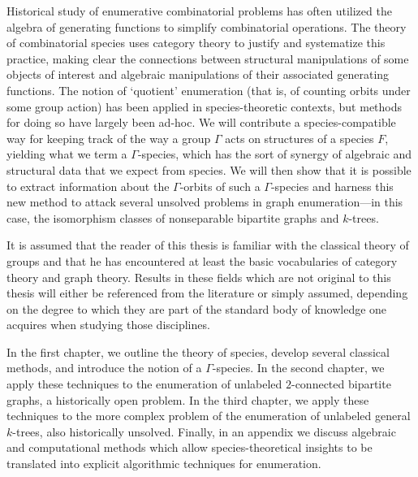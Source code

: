 \documentclass[sectionflow,singlespace,twoside,boldmathhdr,draft]{brandiss} %
\numberwithin{section}{chapter}
\numberwithin{figure}{chapter}
\begin{document}
\begin{disspreface}
  Historical study of enumerative combinatorial problems has often utilized the algebra of generating functions to simplify combinatorial operations.
  The theory of combinatorial species uses category theory to justify and systematize this practice, making clear the connections between structural manipulations of some objects of interest and algebraic manipulations of their associated generating functions.
  The notion of `quotient' enumeration (that is, of counting orbits under some group action) has been applied in species-theoretic contexts, but methods for doing so have largely been ad-hoc.
  We will contribute a species-compatible way for keeping track of the way a group $\Gamma$ acts on structures of a species $F$, yielding what we term a $\Gamma$-species, which has the sort of synergy of algebraic and structural data that we expect from species.
  We will then show that it is possible to extract information about the $\Gamma$-orbits of such a $\Gamma$-species and harness this new method to attack several unsolved problems in graph enumeration---in this case, the isomorphism classes of nonseparable bipartite graphs and $k$-trees.

  It is assumed that the reader of this thesis is familiar with the classical theory of groups and that he has encountered at least the basic vocabularies of category theory and graph theory.
  Results in these fields which are not original to this thesis will either be referenced from the literature or simply assumed, depending on the degree to which they are part of the standard body of knowledge one acquires when studying those disciplines.

  In the first chapter, we outline the theory of species, develop several classical methods, and introduce the notion of a $\Gamma$-species.
  In the second chapter, we apply these techniques to the enumeration of unlabeled $2$-connected bipartite graphs, a historically open problem.
  In the third chapter, we apply these techniques to the more complex problem of the enumeration of unlabeled general $k$-trees, also historically unsolved.
  Finally, in an appendix we discuss algebraic and computational methods which allow species-theoretical insights to be translated into explicit algorithmic techniques for enumeration.
\end{disspreface}

\setcounter{tocdepth}{2}
\tableofcontents %

\listoffigures %
\end{document}
